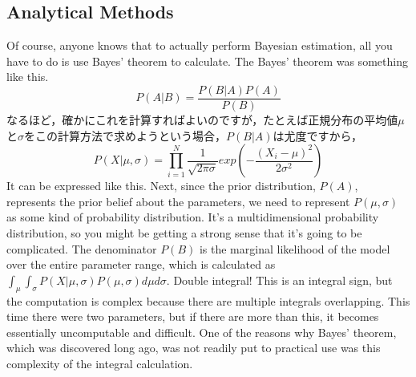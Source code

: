 \documentclass{ltjbook}
\begin{document}
\subsection{Analytical Methods}
Of course, anyone knows that to actually perform Bayesian estimation, all you have to do is use Bayes' theorem to calculate.
The Bayes' theorem was something like this.
\[ P(A|B) = \frac{P(B|A)P(A)}{P(B)} \]
なるほど，確かにこれを計算すればよいのですが，たとえば正規分布の平均値$\mu$と$\sigma$をこの計算方法で求めようという場合，$P(B|A)$は尤度ですから，
\[ P(X|\mu,\sigma) = \prod_{i=1}^N \frac{1}{\sqrt{2\pi \sigma}}exp\left( - \frac{(X_i-\mu)^2}{2\sigma^2}\right) \]
It can be expressed like this. Next, since the prior distribution, $P(A)$, represents the prior belief about the parameters, we need to represent $P(\mu,\sigma)$ as some kind of probability distribution. It's a multidimensional probability distribution, so you might be getting a strong sense that it's going to be complicated.
The denominator $P(B)$ is the marginal likelihood of the model over the entire parameter range, which is calculated as $\int_\mu \int_\sigma P(X|\mu,\sigma)P(\mu,\sigma) d\mu d\sigma$. Double integral! This is an integral sign, but the computation is complex because there are multiple integrals overlapping. This time there were two parameters, but if there are more than this, it becomes essentially uncomputable and difficult. One of the reasons why Bayes' theorem, which was discovered long ago, was not readily put to practical use was this complexity of the integral calculation.
\end{document}

